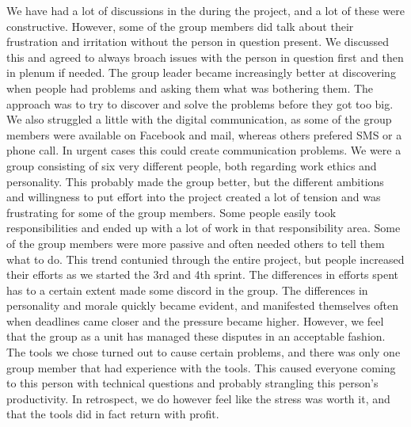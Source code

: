 \newline
\newline
We have had a lot of discussions in the during the project, and a lot of these were constructive. However, some of the group members did talk about their frustration and irritation without the person in question present. We discussed this and agreed to always broach issues with the person in question first and then in plenum if needed. The group leader became increasingly better at discovering when people had problems and asking them what was bothering them. The approach was to try to discover and solve the problems before they got too big. We also struggled a little with the digital communication, as some of the group members were available on Facebook and mail, whereas others prefered SMS or a phone call. In urgent cases this could create communication problems.
\newline
\newline
We were a group consisting of six very different people, both regarding work ethics and personality. This probably made the group better, but the different ambitions and willingness to put effort into the project created a lot of tension and was frustrating for some of the group members. Some people easily took responsibilities and ended up with a lot of work in that responsibility area. Some of the group members  were more passive and often needed others to tell them what to do. This trend contunied through the entire project, but people increased their efforts as we started the 3rd and 4th sprint. The differences in efforts spent has to a certain extent made some discord in the group. 
\newline
\newline
The differences in personality and morale quickly became evident, and manifested themselves often when deadlines came closer and the pressure became higher. However, we feel that the group as a unit has managed these disputes in an acceptable fashion. The tools we chose turned out to cause certain problems, and there was only one group member that had experience with the tools. This caused everyone coming to this person with technical questions and probably strangling this person's productivity. In retrospect, we do however feel like the stress was worth it, and that the tools did in fact return with profit.

